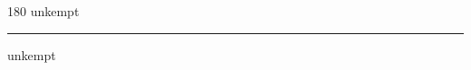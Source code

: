 
\begin{frame}
\begin{center}
\begin{turn}{180}
{\fontsize{2.5cm}{1em}\selectfont unkempt}
\end{turn}
\vspace{1em}\par  
\hrule
\vspace{1em}\par  
{\fontsize{2.5cm}{1em}\selectfont unkempt}
\end{center}
\end{frame}
